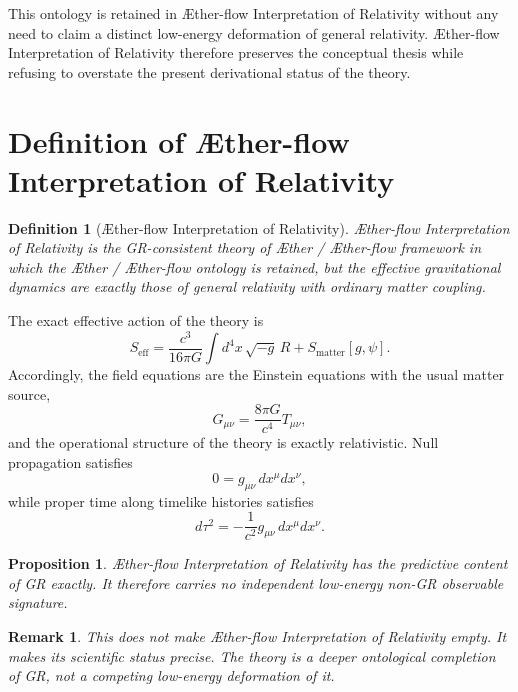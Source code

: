 \documentclass[11pt]{article}
\newcommand{\Aether}{\AE{}ther}
\newcommand{\Aflow}{\AE{}ther-flow}
\newcommand{\TheoryName}{\Aflow{} Interpretation of Relativity}
\newcommand{\TheoryProgram}{\Aether{} / \Aflow{} framework}
\newtheorem{proposition}{Proposition}
\newtheorem{remark}{Remark}
\newtheorem{definition}{Definition}
\begin{document}
This ontology is retained in \TheoryName{} without any need to claim a distinct low-energy deformation of general relativity. \TheoryName{} therefore preserves the conceptual thesis while refusing to overstate the present derivational status of the theory.

\section{Definition of \TheoryName{}}

\begin{definition}[\TheoryName{}]
\TheoryName{} is the GR-consistent theory of \TheoryProgram{} in which the \Aether{} / \Aflow{} ontology is retained, but the effective gravitational dynamics are exactly those of general relativity with ordinary matter coupling.
\end{definition}

The exact effective action of the theory is
\begin{equation}
S_{\mathrm{eff}}
=
\frac{c^3}{16\pi G}\int d^4x\,\sqrt{-g}\,R
+
S_{\mathrm{matter}}[g,\psi].
\label{eq:SA}
\end{equation}
Accordingly, the field equations are the Einstein equations with the usual matter source,
\begin{equation}
G_{\mu\nu} = \frac{8\pi G}{c^4} T_{\mu\nu},
\label{eq:einstein}
\end{equation}
and the operational structure of the theory is exactly relativistic. Null propagation satisfies
\begin{equation}
0 = g_{\mu\nu}\,dx^{\mu}dx^{\nu},
\label{eq:null}
\end{equation}
while proper time along timelike histories satisfies
\begin{equation}
d\tau^2 = -\frac{1}{c^2} g_{\mu\nu}\,dx^{\mu}dx^{\nu}.
\label{eq:propertime}
\end{equation}

\begin{proposition}
\TheoryName{} has the predictive content of GR exactly. It therefore carries no independent low-energy non-GR observable signature.
\end{proposition}

\begin{remark}
This does not make \TheoryName{} empty. It makes its scientific status precise. The theory is a deeper ontological completion of GR, not a competing low-energy deformation of it.
\end{remark}
\end{document}
